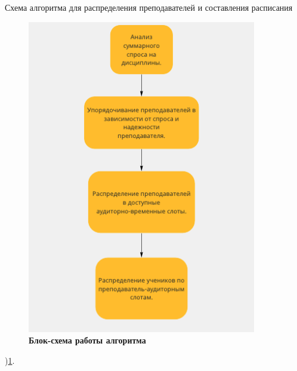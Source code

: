 Схема алгоритма для распределения преподавателей и составления расписания \begin{figure}[!h]
  \centering
  \includegraphics[width=100mm]{Images/alg_block.png}
  \caption{\textbf{Блок-схема работы алгоритма}}
  \label{alg_block}
\end{figure})\ref{alg_block}.
